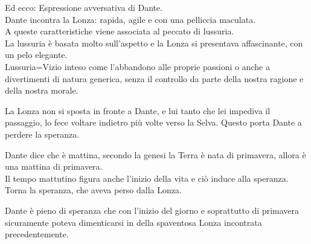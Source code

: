 \documentclass{article}
\begin{document}

Ed ecco: Espressione avversativa di Dante.\\
Dante incontra la Lonza: rapida, agile e con una pelliccia maculata.\\
A queste caratteristiche viene associata al peccato di lussuria.\\
La lussuria è basata molto sull'aspetto e la Lonza si presentava affascinante, con un pelo elegante.\\
Lussuria=Vizio inteso come l'abbandono alle proprie passioni o anche a divertimenti di natura generica, senza il controllo da parte della nostra ragione e della nostra morale.


La Lonza non si sposta in fronte a Dante, e lui tanto che lei impediva il passaggio, lo fece voltare indietro più volte verso la Selva. Questo porta Dante a perdere la speranza.


Dante dice che è mattina, secondo la genesi la Terra è nata di primavera, allora è una mattina di primavera.\\
Il tempo mattutino figura anche l'inizio della vita e ciò induce alla speranza.\\
Torna la speranza, che aveva perso dalla Lonza.


Dante è pieno di speranza che con l'inizio del giorno e soprattutto di primavera sicuramente poteva dimenticarsi in della spaventosa Lonza incontrata precedentemente.

\end{document}
